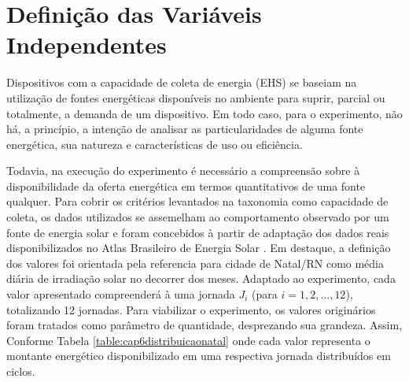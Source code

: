 \section{Definição das Variáveis Independentes}
\label{cap6:variaveisdispositivos}
Dispositivos com a capacidade de coleta de energia (\acl{EHS}) se baseiam na utilização de fontes energéticas disponíveis no ambiente para suprir, parcial ou totalmente, a demanda de um dispositivo. Em todo caso, para o experimento, não há, a princípio, a intenção de analisar as particularidades de alguma fonte energética, sua natureza e características de uso ou eficiência. 

Todavia, na execução do experimento é necessário a compreensão sobre à disponibilidade da oferta energética em termos quantitativos de uma fonte qualquer. Para cobrir os critérios levantados na taxonomia como capacidade de coleta, os dados utilizados se assemelham ao comportamento observado por um fonte de energia solar e foram concebidos à partir de adaptação dos dados reais disponibilizados no Atlas Brasileiro de Energia Solar \cite{martins2017atlas}. Em destaque, a definição dos valores foi orientada pela referencia para cidade de Natal/RN como média diária de irradiação solar no decorrer dos meses. Adaptado ao experimento, cada valor apresentado compreenderá à uma jornada $J_i$ (para $i = 1,2,...,12$), totalizando 12 jornadas. Para viabilizar o experimento, os valores originários foram tratados como parâmetro de quantidade, desprezando sua grandeza. Assim,  Conforme Tabela \ref{table:cap6distribuicaonatal} onde cada valor representa o montante energético disponibilizado em uma respectiva jornada distribuídos em ciclos.

\begingroup

\setlength{\tabcolsep}{10pt} %
\renewcommand{\arraystretch}{1.5} %


